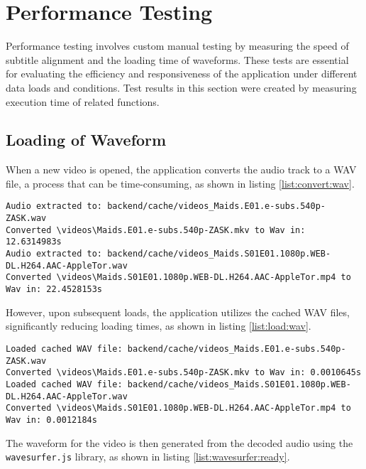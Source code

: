 \section{\textbf{Performance Testing}}

Performance testing involves custom manual testing by measuring the speed of subtitle alignment and the loading time of waveforms. These tests are essential for evaluating the efficiency and responsiveness of the application under different data loads and conditions. Test results in this section were created by measuring execution time of related functions. 

\subsection{Loading of Waveform}
When a new video is opened, the application converts the audio track to a WAV file, a process that can be time-consuming, as shown in listing \ref{list:convert:wav}.

\begin{clisting}
\label{list:convert:wav}
\begin{verbatim}
Audio extracted to: backend/cache/videos_Maids.E01.e-subs.540p-ZASK.wav
Converted \videos\Maids.E01.e-subs.540p-ZASK.mkv to Wav in: 12.6314983s
Audio extracted to: backend/cache/videos_Maids.S01E01.1080p.WEB-DL.H264.AAC-AppleTor.wav
Converted \videos\Maids.S01E01.1080p.WEB-DL.H264.AAC-AppleTor.mp4 to Wav in: 22.4528153s
\end{verbatim}
\end{clisting}

However, upon subsequent loads, the application utilizes the cached WAV files, significantly reducing loading times, as shown in listing \ref{list:load:wav}.

\begin{clisting}
\label{list:load:wav}
\begin{verbatim}
Loaded cached WAV file: backend/cache/videos_Maids.E01.e-subs.540p-ZASK.wav
Converted \videos\Maids.E01.e-subs.540p-ZASK.mkv to Wav in: 0.0010645s
Loaded cached WAV file: backend/cache/videos_Maids.S01E01.1080p.WEB-DL.H264.AAC-AppleTor.wav
Converted \videos\Maids.S01E01.1080p.WEB-DL.H264.AAC-AppleTor.mp4 to Wav in: 0.0012184s
\end{verbatim}
\end{clisting}

The waveform for the video is then generated from the decoded audio using the \texttt{wavesurfer.js} library, as shown in listing \ref{list:wavesurfer:ready}.

